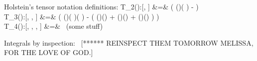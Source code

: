 Holstein's tensor notation definitions:
\bea
T_2():[, ]  \;\;\; \;\;\; \; 
  &=& \left( (\cdot {})( \cdot {}) 
    -   \cdot {} \right)  \\
T_3():[, , ] \;\;\; \;
  &=& \left( (\cdot {})( \cdot {})( \cdot {}) 
    -  \left( (\cdot {})(\cdot{}) 
                       + (\cdot {})(\cdot{})
                       + (\cdot {})(\cdot{})
    \right)
\right)  \\ 
T_4():[, , , ] \;
  &=& \;\,
  \textrm{(some stuff)}  
\eea


Integrals by inspection:  [****** REINSPECT THEM TOMORROW MELISSA, FOR THE LOVE OF GOD.]

